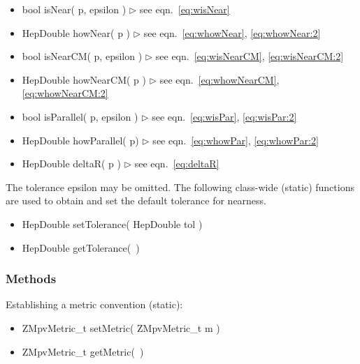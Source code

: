 \documentclass[twoside,12pt]{article}
\newcommand {\see}[1] {\hfill$\triangleright$ see eqn.~#1}
\newenvironment{shortlist}{%
\begin{itemize}
\setlength{\itemsep}{0pt}
\setlength{\parskip}{0pt}
}{%
\end{itemize}
}
\begin{document}
\begin{shortlist}
  \item bool isNear( p, epsilon ) \see{\ref{eq:wisNear}}
  \item HepDouble howNear( p ) \see{\ref{eq:whowNear}, \ref{eq:whowNear:2}}
  \item bool isNearCM( p, epsilon ) \see{\ref{eq:wisNearCM}, \ref{eq:wisNearCM:2}}
  \item HepDouble howNearCM( p ) \see{\ref{eq:whowNearCM}, \ref{eq:whowNearCM:2}}
  \item bool isParallel( p, epsilon ) \see{\ref{eq:wisPar}, \ref{eq:wisPar:2}}
  \item HepDouble howParallel( p) \see{\ref{eq:whowPar}, \ref{eq:whowPar:2}}
  \item HepDouble deltaR( p ) \see{\ref{eq:deltaR}}
\end{shortlist}

\noindent
The tolerance epsilon may be omitted.
The following class-wide (static) functions are used
to obtain and set the default tolerance for nearness.

\begin{shortlist}
  \item HepDouble setTolerance( HepDouble tol )
  \item HepDouble getTolerance(~)
\end{shortlist}

\subsubsection{Methods}

\noindent
Establishing a metric convention (static):

\begin{shortlist}
  \item ZMpvMetric\_t setMetric( ZMpvMetric\_t m )
  \item ZMpvMetric\_t getMetric(~)
\end{shortlist}
\end{document}
